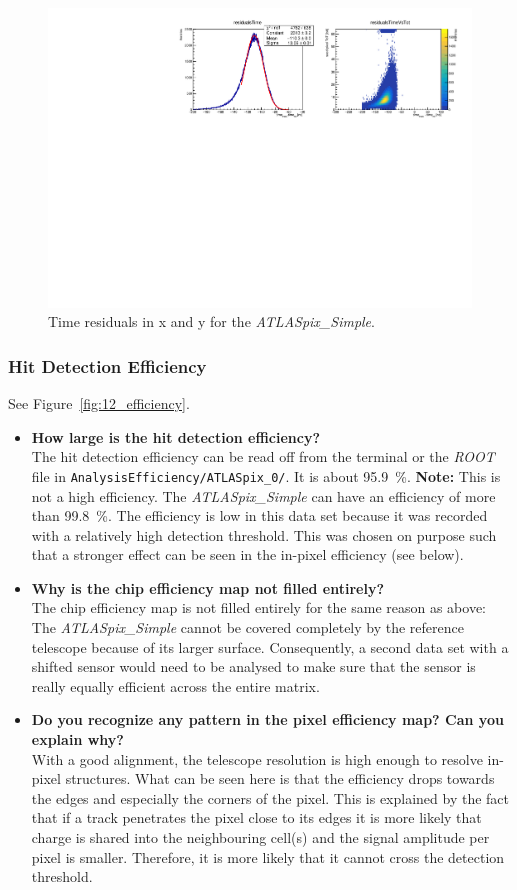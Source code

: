 \documentclass[a4paper,11pt]{article}
\newcommand*{\cernroot}{\emph{ROOT}\xspace}
\newcommand*{\apx}{\emph{ATLASpix\_Simple}\xspace}
\newcommand*{\code}[1]{\texttt{#1}}
\begin{document}
\begin{figure}[!htb]
\centering
\includegraphics[width=\textwidth]{11_timeResiduals}
\caption{Time residuals in x and y for the \apx.}
\label{fig:11_timeResiduals}
\end{figure}

\subsubsection{Hit Detection Efficiency}
See Figure~\ref{fig:12_efficiency}.
\begin{itemize}
\item \textbf{How large is the hit detection efficiency?}\\
The hit detection efficiency can be read off from the terminal or the \cernroot file in \code{AnalysisEfficiency/ATLASpix\_0/}.
It is about \SI{95.9}{\percent}.
\textbf{Note:} This is not a high efficiency.
The \apx can have an efficiency of more than \SI{99.8}{\percent}. 
The efficiency is low in this data set because it was recorded with a relatively high detection threshold.
This was chosen on purpose such that a stronger effect can be seen in the in-pixel efficiency (see below).
\item \textbf{Why is the chip efficiency map not filled entirely?}\\
The chip efficiency map is not filled entirely for the same reason as above: The \apx cannot be covered completely by the reference telescope because of its larger surface.
Consequently, a second data set with a shifted sensor would need to be analysed to make sure that the sensor is really equally efficient across the entire matrix.
\item \textbf{Do you recognize any pattern in the pixel efficiency map? Can you explain why?}\\
With a good alignment, the telescope resolution is high enough to resolve in-pixel structures.
What can be seen here is that the efficiency drops towards the edges and especially the corners of the pixel.
This is explained by the fact that if a track penetrates the pixel close to its edges it is more likely that charge is shared into the neighbouring cell(s) and the signal amplitude per pixel is smaller.
Therefore, it is more likely that it cannot cross the detection threshold.
\end{itemize}
\end{document}
